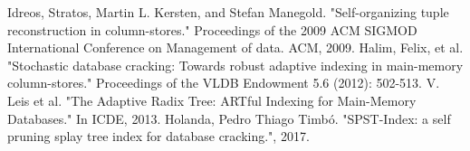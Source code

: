 \documentclass[10pt, conference, compsocconf]{IEEEtran}
\begin{document}
\begin{thebibliography}{8}
Idreos, Stratos, Martin L. Kersten, and Stefan Manegold. "Self-organizing tuple reconstruction in column-stores." Proceedings of the 2009 ACM SIGMOD International Conference on Management of data. ACM, 2009.
Halim, Felix, et al. "Stochastic database cracking: Towards robust adaptive indexing in main-memory column-stores." Proceedings of the VLDB Endowment 5.6 (2012): 502-513.
V. Leis et al. "The Adaptive Radix Tree: ARTful Indexing for
Main-Memory Databases." In ICDE, 2013.
Holanda, Pedro Thiago Timbó. "SPST-Index: a self pruning splay tree index for database cracking.", 2017.

\end{thebibliography}
\end{document}
